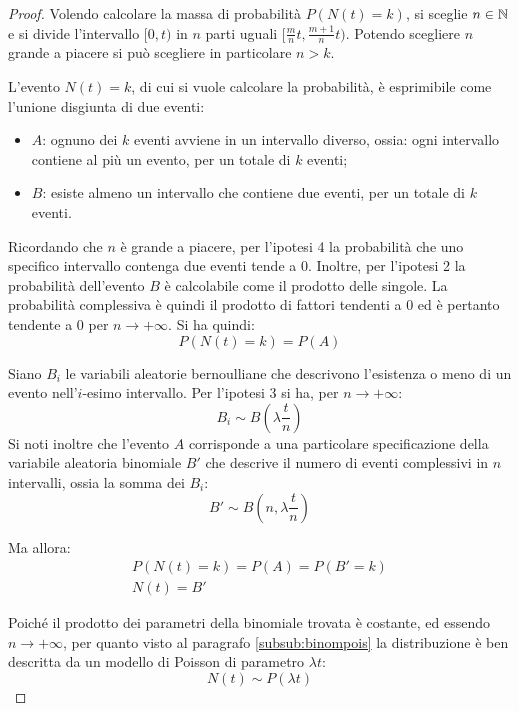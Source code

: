 \begin{proof}
	Volendo calcolare la massa di probabilità $P(N(t)=k)$, si sceglie $n\in\mathbb N$ e si divide l'intervallo $[0,t)$ in $n$ parti uguali $[\frac{m}{n}t,\frac{m+1}{n}t)$. Potendo scegliere $n$ grande a piacere si può scegliere in particolare $n>k$.

	L'evento $N(t)=k$, di cui si vuole calcolare la probabilità, è esprimibile come l'unione disgiunta di due eventi:
	\begin{itemize}
		\item $A$: ognuno dei $k$ eventi avviene in un intervallo diverso, ossia: ogni intervallo contiene al più un evento, per un totale di $k$ eventi;
		\item $B$: esiste almeno un intervallo che contiene due eventi, per un totale di $k$ eventi.
	\end{itemize}

	Ricordando che $n$ è grande a piacere, per l'ipotesi 4 la probabilità che uno specifico intervallo contenga due eventi tende a $0$. Inoltre, per l'ipotesi 2 la probabilità dell'evento $B$ è calcolabile come il prodotto delle singole. La probabilità complessiva è quindi il prodotto di fattori tendenti a $0$ ed è pertanto tendente a $0$ per $n\to+\infty$. Si ha quindi:
	\begin{equation*}
		P(N(t)=k)=P(A)
	\end{equation*}

	Siano $B_i$ le variabili aleatorie bernoulliane che descrivono l'esistenza o meno di un evento nell'$i$-esimo intervallo. Per l'ipotesi 3 si ha, per $n\to+\infty$:
	\begin{equation*}
		B_i \sim B\left(\lambda\frac{t}{n}\right)
	\end{equation*}
	Si noti inoltre che l'evento $A$ corrisponde a una particolare specificazione della variabile aleatoria binomiale $B'$ che descrive il numero di eventi complessivi in $n$ intervalli, ossia la somma dei $B_i$:
	\begin{equation*}
		B'\sim B\left(n, \lambda\frac{t}{n}\right)
	\end{equation*}

	Ma allora:
	\begin{gather*}
		P(N(t)=k) = P(A) = P(B'=k) \\
		N(t) = B'
	\end{gather*}

	Poiché il prodotto dei parametri della binomiale trovata è costante, ed essendo $n\to+\infty$, per quanto visto al paragrafo \ref{subsub:binompois} la distribuzione è ben descritta da un modello di Poisson di parametro $\lambda t$:
	\begin{equation*}
		N(t) \sim P(\lambda t)
	\end{equation*}
\end{proof}
